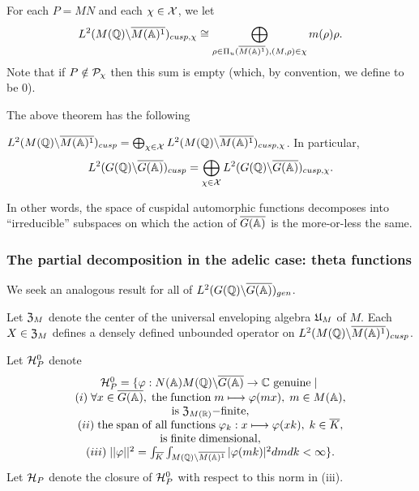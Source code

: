 For each $P=MN$ and each $\chi \in {\cal X}$, we let 
\begin{equation}
L^2(M({{\Bbb{Q}}})\backslash \overline{M({\Bbb{A}})^1})_{cusp,\chi }
\cong
\bigoplus_{\rho \in \Pi _u(\overline{M({\Bbb{A}})^1}) ,
(M,\rho )\in \chi }
m(\rho )\rho .
\end{equation}
Note that if $P\notin {\cal P}_\chi $ then this sum is empty (which, by
convention, we define to be $0$).

The above theorem has the following

\begin{corollary}
$L^2(M({\Bbb{Q}})\backslash \overline{M({\Bbb{A}})^1})_{cusp}
=\bigoplus_{\chi \in {\cal X}}
L^2(M({\Bbb{Q}})\backslash \overline{M({\Bbb{A}})^1})_{cusp,\chi }$.
In particular, 
\[
L^2(G({\Bbb{Q}})\backslash \overline{G({\Bbb{A}})})_{cusp}
=\bigoplus_{\chi \in {\cal X}}
L^2(G({\Bbb{Q}})\backslash \overline{G({\Bbb{A}})})_{cusp,\chi }.
\]
\end{corollary}

In other words, the space of cuspidal automorphic functions decomposes into
``irreducible'' subspaces on which the action of $\overline{G({\Bbb{A}})}$ is the
more-or-less the same.

\subsubsection{The partial decomposition in the adelic case: theta functions}

We seek an analogous result for all of
$L^2(G({\Bbb{Q}})\backslash \overline{G({\Bbb{A}})})_{gen}$.

Let ${\frak{Z}}_M$ denote the center of the
universal enveloping algebra ${\frak{U}}_M$ of $M$. Each
$X\in {\frak{Z}}_M$ defines a densely defined
unbounded operator on
$L^2(M({\Bbb{Q}})\backslash \overline{M({\Bbb{A}})^1})_{cusp}$.

Let ${\cal H}_P^0$ denote 
\begin{equation}
\begin{array}{c}
{\cal H}_P^0
=\{\varphi :N({\Bbb{A}})M({\Bbb{Q}})
\backslash \overline{G({\Bbb{A}})}\rightarrow {\Bbb{C}}
\ {\rm genuine}\;|\; \\ 
(i)\;\forall x\in \overline{G({\Bbb{A}})},
\;{\rm the\;function}\;m\longmapsto \varphi (mx),
\;m\in M({\Bbb{A}}), \\ 
{\rm is}\;{\frak{Z}}_{M({\Bbb{R}})}{\rm -finite}, \\ 
(ii)\;{\rm the\;span\;of\;all\;functions}
\;\varphi _k:x\longmapsto \varphi (xk),\;k\in \overline{K}, \\ 
{\rm is\;finite\;}{\rm dimensional}, \\ 
(iii)\;||\varphi ||^2=
\int_{\overline{K}}
\int_{M({\Bbb{Q}})\backslash \overline{M({\Bbb{A}})^1}}
|\varphi (mk)|^2dmdk<\infty \} .
\end{array}
\end{equation}
Let ${\cal H}_P$ denote the closure of ${\cal H}_P^0$ with respect to this
norm in (iii).

